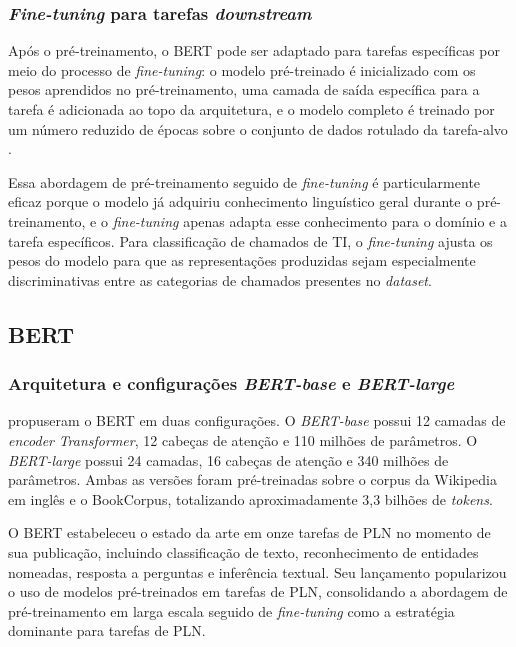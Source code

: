 \documentclass[
    12pt,                %
    openright,           %
    oneside,             %
    a4paper,             %
    english,             %
    brazil               %
]{abntex2}
\begin{document}
\subsubsection{\textit{Fine-tuning} para tarefas \textit{downstream}}
\label{subsubsec:bert_finetune}

Após o pré-treinamento, o BERT pode ser adaptado para tarefas específicas por meio do processo de \textit{fine-tuning}: o modelo pré-treinado é inicializado com os pesos aprendidos no pré-treinamento, uma camada de saída específica para a tarefa é adicionada ao topo da arquitetura, e o modelo completo é treinado por um número reduzido de épocas sobre o conjunto de dados rotulado da tarefa-alvo \cite{devlin2019}.

Essa abordagem de pré-treinamento seguido de \textit{fine-tuning} é particularmente eficaz porque o modelo já adquiriu conhecimento linguístico geral durante o pré-treinamento, e o \textit{fine-tuning} apenas adapta esse conhecimento para o domínio e a tarefa específicos. Para classificação de chamados de TI, o \textit{fine-tuning} ajusta os pesos do modelo para que as representações produzidas sejam especialmente discriminativas entre as categorias de chamados presentes no \textit{dataset}.

\subsection{BERT}
\label{subsec:bert_modelo}

\subsubsection{Arquitetura e configurações \textit{BERT-base} e \textit{BERT-large}}
\label{subsubsec:bert_arquitetura}

 propuseram o BERT em duas configurações. O \textit{BERT-base} possui 12 camadas de \textit{encoder} \textit{Transformer}, 12 cabeças de atenção e 110 milhões de parâmetros. O \textit{BERT-large} possui 24 camadas, 16 cabeças de atenção e 340 milhões de parâmetros. Ambas as versões foram pré-treinadas sobre o corpus da Wikipedia em inglês e o BookCorpus, totalizando aproximadamente 3,3 bilhões de \textit{tokens}.

O BERT estabeleceu o estado da arte em onze tarefas de PLN no momento 
de sua publicação, incluindo classificação de texto, reconhecimento 
de entidades nomeadas, resposta a perguntas e inferência textual. 
Seu lançamento popularizou o uso de modelos pré-treinados em tarefas 
de PLN, consolidando a abordagem de pré-treinamento em larga escala 
seguido de \textit{fine-tuning} como a estratégia dominante para 
tarefas de PLN.
\end{document}
